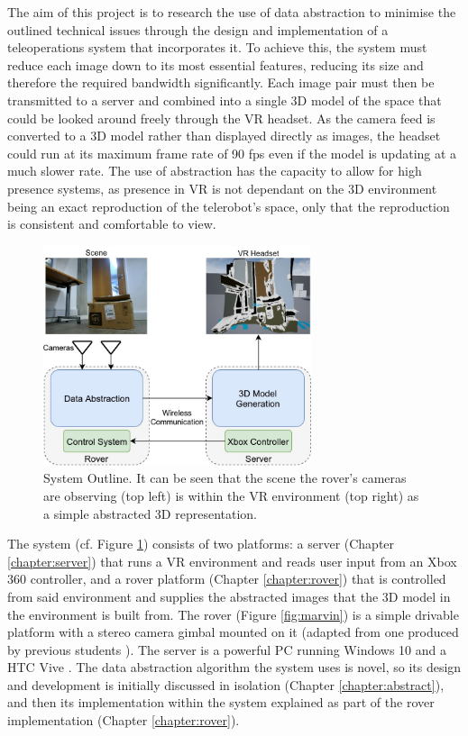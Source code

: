 The aim of this project is to research the use of data abstraction to minimise the outlined technical issues through the design and implementation of a teleoperations system that incorporates it. To achieve this, the system must reduce each image down to its most essential features, reducing its size and therefore the required bandwidth significantly. Each image pair must then be transmitted to a server and combined into a single 3D model of the space that could be looked around freely through the VR headset. As the camera feed is converted to a 3D model rather than displayed directly as images, the headset could run at its maximum frame rate of 90 fps even if the model is updating at a much slower rate. The use of abstraction has the capacity to allow for high presence systems, as presence in VR is not dependant on the 3D environment being an exact reproduction of the telerobot's space, only that the reproduction is consistent and comfortable to view. 

\begin{figure}[H]
    \begin{center}
      \includegraphics[width=0.7\textwidth]{Figures/Outline.jpg}
      \caption[System Outline]{System Outline. It can be seen that the scene the rover's cameras are observing (top left) is within the VR environment (top right) as a simple abstracted 3D representation.}
      \label{fig:outline}
    \end{center}
\end{figure}

The system (cf. Figure \ref{fig:outline}) consists of two platforms: a server (Chapter \ref{chapter:server}) that runs a VR environment and reads user input from an Xbox 360 controller, and a rover platform (Chapter \ref{chapter:rover}) that is controlled from said environment and supplies the abstracted images that the 3D model in the environment is built from. The rover (Figure \ref{fig:marvin}) is a simple drivable platform with a stereo camera gimbal mounted on it (adapted from one produced by previous students \cite{gimble}). The server is a powerful PC running Windows 10 \cite{windows} and a HTC Vive \cite{Vive}. The data abstraction algorithm the system uses is novel, so its design and development is initially discussed in isolation (Chapter \ref{chapter:abstract}), and then its implementation within the system explained as part of the rover implementation (Chapter \ref{chapter:rover}).

